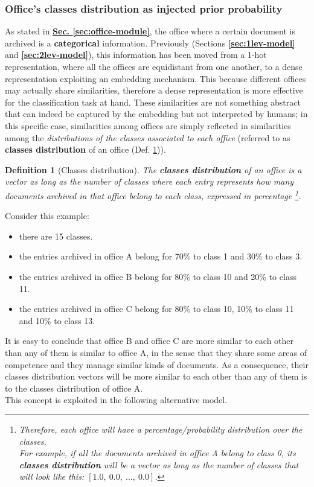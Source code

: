 \documentclass[12pt]{article}
\begin{document}
\subsubsection{Office's classes distribution as injected prior probability}\label{sec:cls-distr-bias}
As stated in \hyperref[sec:office-module]{\textbf{Sec. \ref{sec:office-module}}}, the office where a certain document is archived is a \textbf{categorical} information.
Previously (Sections \textbf{\ref{sec:1lev-model}} and \textbf{\ref{sec:2lev-model}}), this information has been moved from a 1-hot representation, where all the offices are equidistant from one another, to a dense representation exploiting an embedding mechanism.
This because different offices may actually share similarities, therefore a dense representation is more effective for the classification task at hand.
These similarities are not something abstract that can indeed be captured by the embedding but not interpreted by humans;
in this specific case, similarities among offices are simply reflected in similarities among the \textit{distributions of the classes associated to each office} (referred to as \textbf{classes distribution} of an office (Def. \ref{def:cls_distr})).
\newtheorem{definition}{Definition}
\begin{definition}[Classes distribution]\label{def:cls_distr}
    The \textbf{classes distribution} of an office is a vector as long as the number of classes where each entry represents how many documents archived in that office belong to each class, expressed in percentage
    \footnote{Therefore, each office will have a percentage/probability distribution over the classes.\\For example, if all the documents archived in \textit{office A} belong to class 0, its \textbf{classes distribution} will be a vector as long as the number of classes that will look like this: $[1.0,\ 0.0,\ ...,\ 0.0]$.}.
\end{definition}
Consider this example:
\begin{itemize}
    \item there are 15 classes.
    \item the entries archived in office A belong for 70\% to class 1 and 30\% to class 3.
    \item the entries archived in office B belong for 80\% to class 10 and 20\% to class 11.
    \item the entries archived in office C belong for 80\% to class 10, 10\% to class 11 and 10\% to class 13.
\end{itemize}
It is easy to conclude that office B and office C are more similar to each other than any of them is similar to office A, in the sense that they share some areas of competence and they manage similar kinds of documents.
As a consequence, their classes distribution vectors will be more similar to each other than any of them is to the classes distribution of office A.\\
This concept is exploited in the following alternative model.
\end{document}
